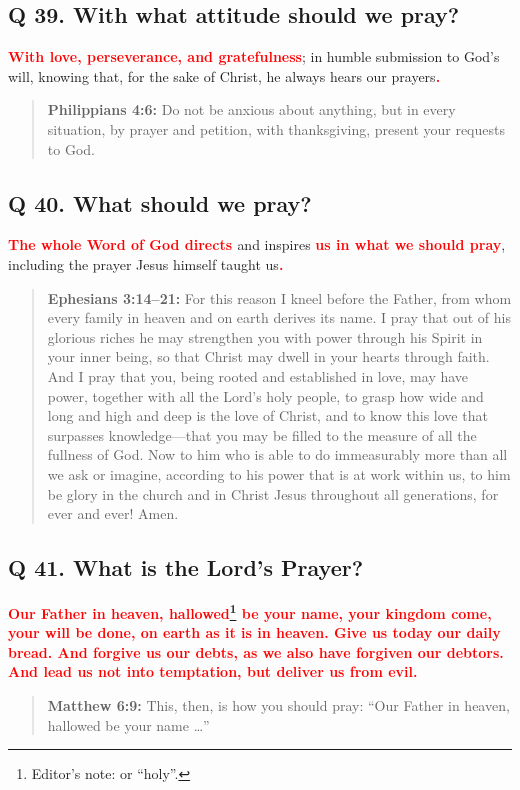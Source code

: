 \documentclass[]{memoir}
\newcommand\Children[1]{\textbf{\textcolor{red}{#1}}}
\newcommand\Quote[2]{\begin{quote}{\textbf{#1:}{ #2}}\end{quote}}
\begin{document}
\subsection{Q 39. With what attitude should we pray?}
\Children{With love, perseverance, and gratefulness}; in humble submission to God's will, knowing that, for the sake of Christ, he always hears our prayers\Children{.}

\Quote{Philippians 4:6}{Do not be anxious about anything, but in every situation, by prayer and petition, with thanksgiving, present your requests to God.}

\subsection{Q 40. What should we pray?}
\Children{The whole Word of God directs }and inspires \Children{us in what we should pray}, including the prayer Jesus himself taught us\Children{.}

\Quote{Ephesians 3:14--21}{For this reason I kneel before the Father, from whom every family in heaven and on earth derives its name. I pray that out of his glorious riches he may strengthen you with power through his Spirit in your inner being, so that Christ may dwell in your hearts through faith. And I pray that you, being rooted and established in love, may have power, together with all the Lord's holy people, to grasp how wide and long and high and deep is the love of Christ, and to know this love that surpasses knowledge\thinspace{}---\thinspace{}that you may be filled to the measure of all the fullness of God. Now to him who is able to do immeasurably more than all we ask or imagine, according to his power that is at work within us, to him be glory in the church and in Christ Jesus throughout all generations, for ever and ever! Amen.}

\subsection{Q 41. What is the Lord's Prayer?}
\Children{Our Father in heaven, hallowed\footnote{Editor's note: or ``holy''.} be your name, your kingdom come, your will be done, on earth as it is in heaven. Give us today our daily bread. And forgive us our debts, as we also have forgiven our debtors. And lead us not into temptation, but deliver us from evil.}

\Quote{Matthew 6:9}{This, then, is how you should pray: ``Our Father in heaven, hallowed be your name {\dots}''}
\end{document}
